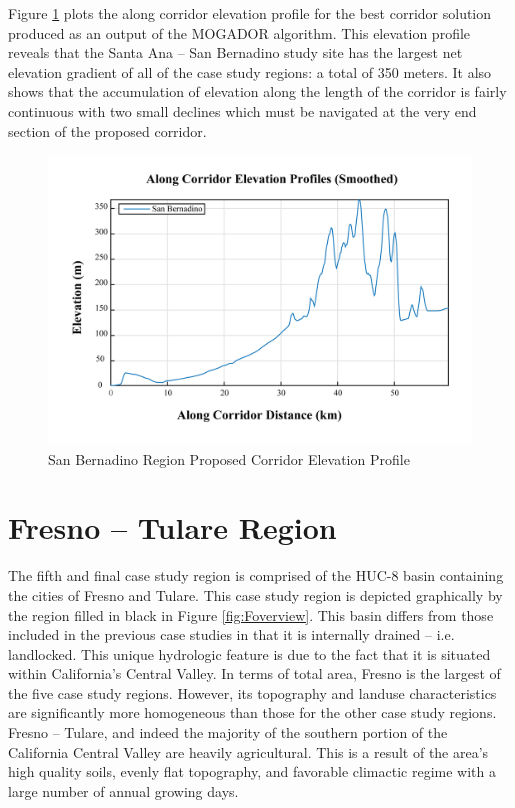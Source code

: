 Figure \ref{fig:SASBelevationProfile} plots the along corridor elevation profile for the best corridor solution produced as an output of the MOGADOR algorithm. This elevation profile reveals that the Santa Ana -- San Bernadino study site has the largest net elevation gradient of all of the case study regions: a total of 350 meters. It also shows that the accumulation of elevation along the length of the corridor is fairly continuous with two small declines which must be navigated at the very end section of the proposed corridor. 
        
        \begin{figure}[!h]
            \begin{center}
            \includegraphics[width=5.5in]{figures/SanBernadino_Elevation_Profile.png}   
            \caption{San Bernadino Region Proposed Corridor Elevation Profile}
            \label{fig:SASBelevationProfile}
            \end{center}
        \end{figure}

\clearpage

\section{Fresno -- Tulare Region}

The fifth and final case study region is comprised of the HUC-8 basin containing the cities of Fresno and Tulare. This case study region is depicted graphically by the region filled in black in Figure \ref{fig:Foverview}. This basin differs from those included in the previous case studies in that it is internally drained -- i.e. landlocked. This unique hydrologic feature is due to the fact that it is situated within California's Central Valley. In terms of total area, Fresno is the largest of the five case study regions. However, its topography and landuse characteristics are significantly more homogeneous than those for the other case study regions. Fresno -- Tulare, and indeed the majority of the southern portion of the California Central Valley are heavily agricultural. This is a result of the area's high quality soils, evenly flat topography, and favorable climactic regime with a large number of annual growing days. 

